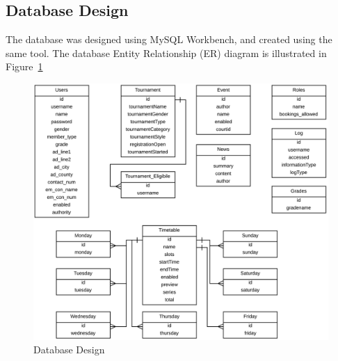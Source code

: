 \subsection{Database Design}

The database was designed using MySQL Workbench, and created using the same tool. The database Entity Relationship (ER) diagram is illustrated in Figure~\ref{fig:dbdesign}

\begin{figure}[H]
\begin{center}
\includegraphics[width=14cm]{dbdesign.png}
\end{center}
\caption{Database Design}
\label{fig:dbdesign}
\end{figure}

